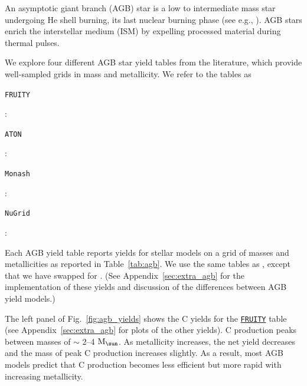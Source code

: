 \documentclass[fleqn,
usenatbib]{mnras}
\newcommand{\fruity}{\texttt{\hyperlink{fruity}{FRUITY}}}
\newcommand{\Mo}{ {\rm M}_{\sun}}
\begin{document}
An asymptotic giant branch (AGB) star is a low to intermediate mass star undergoing He shell burning, its last nuclear burning phase (see e.g., \citealt{PR2023}). AGB stars enrich the interstellar medium (ISM) by expelling processed material during thermal pulses. 


We explore four different AGB star yield tables from the literature, which provide well-sampled grids in mass and metallicity. We refer to the tables as 
\begin{description}
    \item \hypertarget{fruity}{\texttt{FRUITY}}: \citet{cristallo+11, cristallo+15}
    \item \hypertarget{aton}{\texttt{ATON}}: \citet{ventura+13,ventura+14,ventura+18, ventura+20}
    \item \hypertarget{monash}{\texttt{Monash}}: \citet{KL16, karakas+18}
    \item \hypertarget{nugrid}{\texttt{NuGrid}}: \citet{pignatari+16, ritter+18, battino+19, battino+21}
\end{description}
Each AGB yield table reports yields for stellar models on a grid of masses and metallicities as reported in Table~\ref{tab:agb}.
We use the same tables as \citet{james+23}, except that we have swapped \citet{karakas10} for \citet{pignatari+16}. (See Appendix~\ref{sec:extra_agb} for the implementation of these yields and discussion of the differences between AGB yield models.)



The left panel of Fig.~\ref{fig:agb_yields} shows the C yields for the \fruity{} table (see Appendix~\ref{sec:extra_agb} for plots of the other yields). C production peaks between masses of $\sim$ 2--4 $\Mo$. As metallicity increases, the net yield decreases and the mass of peak C production increases slightly. As a result, most AGB models predict that C production becomes less efficient but more rapid with increasing metallicity.
\end{document}
